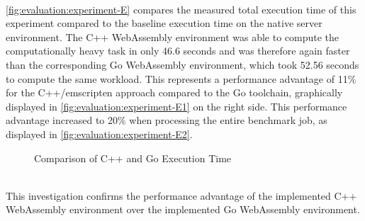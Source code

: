 ~\\
\autoref{fig:evaluation:experiment-E} compares the measured total execution time of this experiment compared to the baseline execution time on the native server environment. The C++ WebAssembly environment was able to compute the computationally heavy task in only 46.6 seconds and was therefore again faster than the corresponding Go WebAssembly environment, which took 52.56 seconds to compute the same workload. This represents a performance advantage of 11\% for the C++/emscripten approach compared to the Go toolchain, graphically displayed in \autoref{fig:evaluation:experiment-E1} on the right side. This performance advantage increased to 20\% when processing the entire benchmark job, as displayed in \autoref{fig:evaluation:experiment-E2}.
\clearpage
\begin{figure}[htbp] \ContinuedFloat
    \myfloatalign
    \caption{Comparison of C++ and Go Execution Time}
    \label{fig:evaluation:experiment-E}
\end{figure}
~\\
This investigation confirms the performance advantage of the implemented C++ WebAssembly environment over the implemented Go WebAssembly environment.